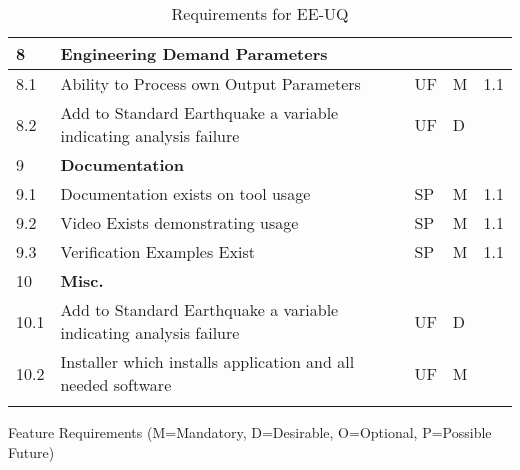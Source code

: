 \begin{longtable}{| p{} | p{} | p{} | p{} |  p{} |}
    8 & \textbf{Engineering Demand Parameters} &  &  \\ \hline
    8.1 & Ability to Process own Output Parameters & UF & M & 1.1  \\ \hline
    8.2 & Add to Standard Earthquake a variable indicating analysis failure & UF & D &   \\ \hline
    9 & \textbf{Documentation} &  &  \\ \hline
    9.1 & Documentation exists on tool usage & SP & M & 1.1  \\ \hline
    9.2 & Video Exists demonstrating usage & SP & M & 1.1  \\ \hline
    9.3 & Verification Examples Exist & SP & M & 1.1  \\ \hline
    10 & \textbf{Misc.} &  &  \\ \hline
    10.1 & Add to Standard Earthquake a variable indicating analysis failure & UF & D &   \\ \hline
    10.2 & Installer which installs application and all needed software & UF & M &   \\ \hline
  \bottomrule 
\caption{Requirements for EE-UQ}
  \label{tab:featureRequirements}                 
\end{longtable}

Feature Requirements (M=Mandatory, D=Desirable, O=Optional, P=Possible Future)
